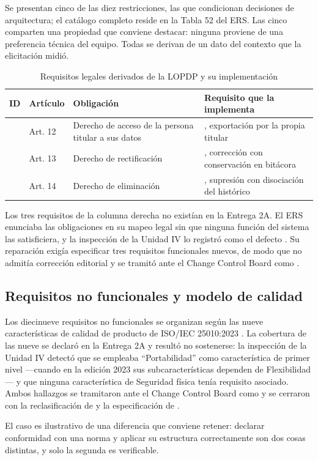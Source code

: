 \noindent
Se presentan cinco de las diez restricciones, las que condicionan decisiones de arquitectura; el
catálogo completo reside en la Tabla 52 del ERS. Las cinco comparten una propiedad que conviene
destacar: ninguna proviene de una preferencia técnica del equipo. Todas se derivan de un dato del
contexto que la elicitación midió.

\begin{table}[H]
\centering\footnotesize
\caption{Requisitos legales derivados de la LOPDP y su implementación}
\label{tab:rl}
\begin{tabular}{|C{1.4cm}|C{1.6cm}|L{5.6cm}|L{5.6cm}|}
\hline
{}\textbf{ID} & \textbf{Artículo} & \textbf{Obligación} & \textbf{Requisito que la implementa}\\ \hline
{} & Art. 12 & Derecho de acceso de la persona titular a sus datos & , exportación por la propia titular\\ \hline
{} & Art. 13 & Derecho de rectificación & , corrección con conservación en bitácora\\ \hline
{} & Art. 14 & Derecho de eliminación & , supresión con disociación del histórico\\ \hline
\end{tabular}
\end{table}

\noindent
Los tres requisitos de la columna derecha no existían en la Entrega 2A. El ERS enunciaba las
obligaciones en su mapeo legal sin que ninguna función del sistema las satisficiera, y la inspección
de la Unidad IV lo registró como el defecto . Su reparación exigía especificar tres
requisitos funcionales nuevos, de modo que no admitía corrección editorial y se tramitó ante el
Change Control Board como .

\subsection{Requisitos no funcionales y modelo de calidad}

Los diecinueve requisitos no funcionales se organizan según las nueve características de calidad de
producto de ISO/IEC 25010:2023 \cite{iso25010}. La cobertura de las nueve se declaró en la Entrega 2A
y resultó no sostenerse: la inspección de la Unidad IV detectó que se empleaba ``Portabilidad'' como
característica de primer nivel ---cuando en la edición 2023 sus subcaracterísticas dependen de
Flexibilidad--- y que ninguna característica de Seguridad física tenía requisito asociado. Ambos
hallazgos se tramitaron ante el Change Control Board como  y se cerraron con la
reclasificación de  y la especificación de .

El caso es ilustrativo de una diferencia que conviene retener: declarar conformidad con una norma y
aplicar su estructura correctamente son dos cosas distintas, y solo la segunda es verificable.
